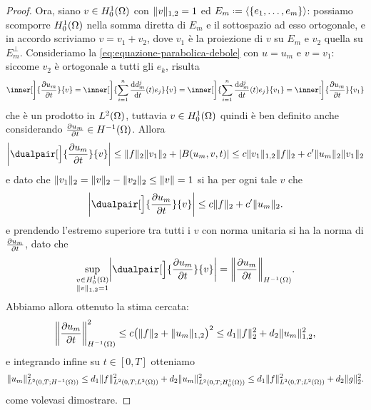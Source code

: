 \begin{proof}
    Ora, siano $v\in\sobHc[1]{\Omega}$ con $\norm{v}_{1,2}=1$ ed $E_m\defeq\gen{\{e_1,\dotsc,e_m\}}$: possiamo scomporre $\sobHc[1]{\Omega}$ nella somma diretta di $E_m$ e il sottospazio ad esso ortogonale, e in accordo scriviamo $v=v_1+v_2$, dove $v_1$ è la proiezione di $v$ su $E_m$ e $v_2$ quella su $E_m^\perp$.
    Consideriamo la \eqref{eq:equazione-parabolica-debole} con $u=u_m$ e $v=v_1$: siccome $v_2$ è ortogonale a tutti gli $e_k$, risulta
    \begin{equation}
        \inner[\bigg]{\drp{u_m}{t}}{v}=
        \inner[\bigg]{\sum_{i=1}^n\drv{d^j_m}{t}(t)e_j}{v}=
        \inner[\bigg]{\sum_{i=1}^n\drv{d^j_m}{t}(t)e_j}{v_1}=
        \inner[\bigg]{\drp{u_m}{t}}{v_1}
    \end{equation}
    che è un prodotto in $\leb[2]{\Omega}$, tuttavia $v\in\sobHc[1]{\Omega}$ quindi è ben definito anche considerando $\drp{u_m}{t}\in\sobH[-1]{\Omega}$.
    Allora
    \begin{equation}
        \abs[\bigg]{\dualpair[\Big]{\drp{u_m}{t}}{v}}\le
        \norm{f}_2\norm{v_1}_2+\abs{B(u_m,v,t)}\le
        c\norm{v_1}_{1,2}\norm{f}_2+c'\norm{u_m}_2\norm{v_1}_2
    \end{equation}
    e dato che $\norm{v_1}_2=\norm{v}_2-\norm{v_2}_2\le\norm{v}=1$ si ha per ogni tale $v$ che
    \begin{equation}
        \abs[\bigg]{\dualpair[\Big]{\drp{u_m}{t}}{v}}\le
        c\norm{f}_2+c'\norm{u_m}_2.
    \end{equation}
    e prendendo l'estremo superiore tra tutti i $v$ con norma unitaria si ha la norma di $\drp{u_m}{t}$, dato che
    \begin{equation}
        \sup_{\substack{v\in\sobHc[1]{\Omega}\\\norm{v}_{1,2}=1}}\abs[\bigg]{\dualpair[\Big]{\drp{u_m}{t}}{v}}=\norm[\bigg]{\drp{u_m}{t}}_{\sobH[-1]{\Omega}}.
    \end{equation}
    Abbiamo allora ottenuto la stima cercata:
    \begin{equation}
        \norm[\bigg]{\drp{u_m}{t}}_{\sobH[-1]{\Omega}}^2\le
        c\bigl(\norm{f}_2+\norm{u_m}_{1,2}\bigr)^2\le
        d_1\norm{f}_2^2+d_2\norm{u_m}_{1,2}^2,
    \end{equation}
    e integrando infine su $t\in[0,T]$ otteniamo
    \begin{equation}
        \norm{u_m}_{\leb[2]{0,T;\sobH[-1]{\Omega}}}^2\le
        d_1\norm{f}_{\leb[2]{0,T;\leb[2]{\Omega}}}^2+d_2\norm{u_m}_{\leb[2]{0,T;\sobHc[1]{\Omega}}}^2\le
        d_1\norm{f}_{\leb[2]{0,T;\leb[2]{\Omega}}}^2+d_2\norm{g}_2^2.
    \end{equation}
    come volevasi dimostrare.
\end{proof}
